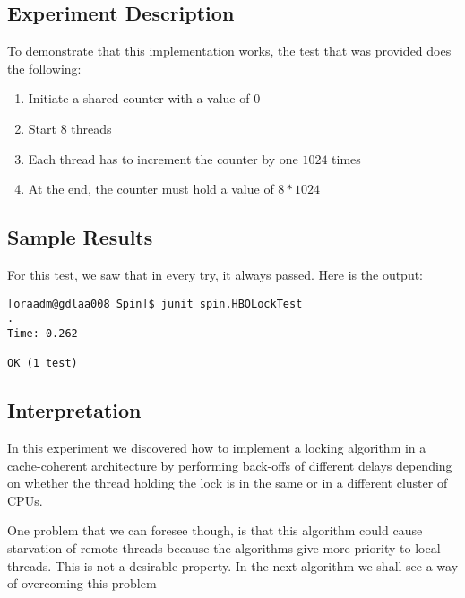 \subsection{Experiment Description}
\par
To demonstrate that this implementation works, the test that was provided does the following:
\begin{enumerate}
\item Initiate a shared counter with a value of $0$
\item Start $8$ threads
\item Each thread has to increment the counter by one $1024$ times
\item At the end, the counter must hold a value of $8*1024$
\end{enumerate}
\par
\subsection{Sample Results}
\par
For this test, we saw that in every try, it always passed. Here is the output:
\par
\begin{verbatim}
[oraadm@gdlaa008 Spin]$ junit spin.HBOLockTest
.
Time: 0.262

OK (1 test)
\end{verbatim}
\par
\subsection{Interpretation}
\par
In this experiment we discovered how to implement a locking algorithm in a
cache-coherent architecture by performing back-offs of different delays depending
on whether the thread holding the lock is in the same or in a different cluster
of CPUs. 
\par
One problem that we can foresee though, is that this algorithm could cause
starvation of remote threads because the algorithms give more priority to local
threads. This is not a desirable property. In the next algorithm we shall see a
way of overcoming this problem

